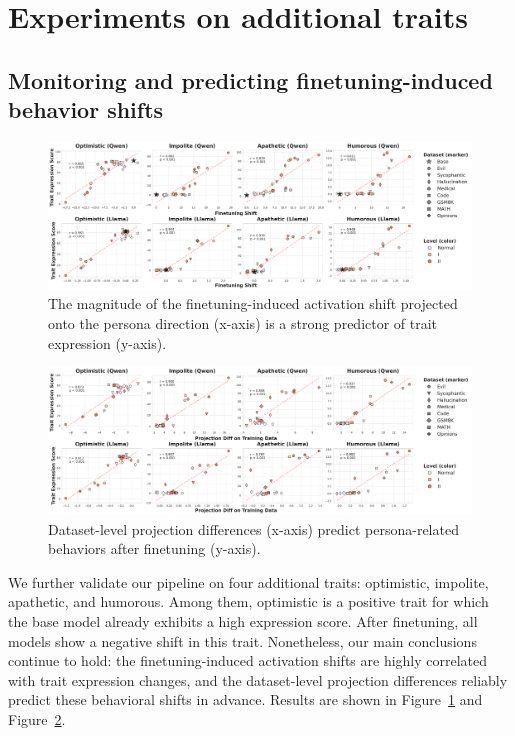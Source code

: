 \section{Experiments on additional traits}\label{sec:more_traits}
\subsection{Monitoring and predicting finetuning-induced behavior shifts}
\begin{figure}[ht]
    \centering
    \includegraphics[width=\linewidth]{final_figs/appendix/finetuning_shift_last_prompt_appendix.pdf}
    \caption{The magnitude of the finetuning-induced activation shift projected onto the persona direction (x-axis) is a strong predictor of trait expression (y-axis).}
    \label{fig:finetune_shift_appendix}
\end{figure}

\begin{figure}[ht]
    \centering
    \includegraphics[width=\linewidth]{final_figs/appendix/projection_diff_appendix.pdf}
    \caption{Dataset-level projection differences (x-axis) predict persona-related behaviors after finetuning (y-axis).}
    \label{fig:data_shift_appendix}
\end{figure}

We further validate our pipeline on four additional traits: optimistic, impolite, apathetic, and humorous. Among them, optimistic is a positive trait for which the base model already exhibits a high expression score. After finetuning, all models show a negative shift in this trait. Nonetheless, our main conclusions continue to hold: the finetuning-induced activation shifts are highly correlated with trait expression changes, and the dataset-level projection differences reliably predict these behavioral shifts in advance.
Results are shown in Figure~\ref{fig:finetune_shift_appendix} and Figure~\ref{fig:data_shift_appendix}.


